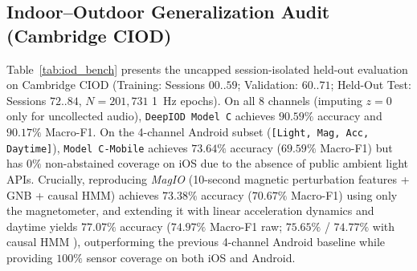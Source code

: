 \documentclass[journal]{IEEEtran}
\begin{document}
\subsection{Indoor--Outdoor Generalization Audit (Cambridge CIOD)}
Table~\ref{tab:iod_bench} presents the uncapped session-isolated held-out evaluation on Cambridge CIOD \cite{bakirtzis2022ciod} (Training: Sessions $00\text{..}59$; Validation: $60\text{..}71$; Held-Out Test: Sessions $72\text{..}84$, $N = 201{,}731$ 1~Hz epochs). On all 8 channels (imputing $z = 0$ only for uncollected audio), \texttt{DeepIOD Model C} achieves $\mathbf{90.59\%}$ accuracy and $\mathbf{90.17\%}$ Macro-F1. On the 4-channel Android subset (\texttt{[Light, Mag, Acc, Daytime]}), \texttt{Model C-Mobile} achieves $73.64\%$ accuracy ($69.59\%$ Macro-F1) but has $0\%$ non-abstained coverage on iOS due to the absence of public ambient light APIs. Crucially, reproducing \emph{MagIO} \cite{ashraf2018magio} (10-second magnetic perturbation features + GNB + causal HMM) achieves $73.38\%$ accuracy ($70.67\%$ Macro-F1) using only the magnetometer, and extending it with linear acceleration dynamics \cite{kelishomi2019activities} and daytime yields $\mathbf{77.07\%}$ accuracy ($\mathbf{74.97\%}$ Macro-F1 raw; $75.65\%$ / $74.77\%$ with causal HMM \cite{zhu2019fast}), outperforming the previous 4-channel Android baseline while providing $100\%$ sensor coverage on both iOS and Android.

\begin{table}[t]
\centering
\caption{Session-Isolated Held-Out Indoor--Outdoor Benchmark on Cambridge CIOD (Sessions 72..84, $N = 201{,}731$)}
\label{tab:iod_bench}
\renewcommand{\arraystretch}{1.15}
\end{table}
\end{document}
